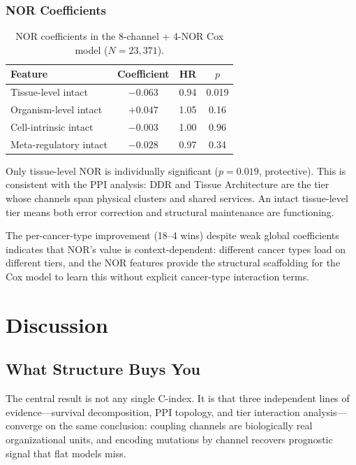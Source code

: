 \documentclass[11pt]{article}
\begin{document}
\subsubsection{NOR Coefficients}

\begin{table}[ht]
\centering
\caption{NOR coefficients in the 8-channel + 4-NOR Cox model
($N = 23{,}371$).}
\label{tab:nor-coefs}
\begin{tabular}{@{}lccc@{}}
\toprule
Feature & Coefficient & HR & $p$ \\
\midrule
Tissue-level intact & $-0.063$ & 0.94 & 0.019 \\
Organism-level intact & $+0.047$ & 1.05 & 0.16 \\
Cell-intrinsic intact & $-0.003$ & 1.00 & 0.96 \\
Meta-regulatory intact & $-0.028$ & 0.97 & 0.34 \\
\bottomrule
\end{tabular}
\end{table}

Only tissue-level NOR is individually significant ($p = 0.019$,
protective). This is consistent with the PPI analysis: DDR and
Tissue Architecture are the tier whose channels span physical
clusters and shared services. An intact tissue-level tier means
both error correction and structural maintenance are functioning.

The per-cancer-type improvement (18--4 wins) despite weak global
coefficients indicates that NOR's value is context-dependent:
different cancer types load on different tiers, and the NOR
features provide the structural scaffolding for the Cox model to
learn this without explicit cancer-type interaction terms.

\section{Discussion}
\label{sec:discussion}

\subsection{What Structure Buys You}

The central result is not any single C-index. It is that three
independent lines of evidence---survival decomposition, PPI
topology, and tier interaction analysis---converge on the same
conclusion: coupling channels are biologically real
organizational units, and encoding mutations by channel recovers
prognostic signal that flat models miss.
\end{document}
